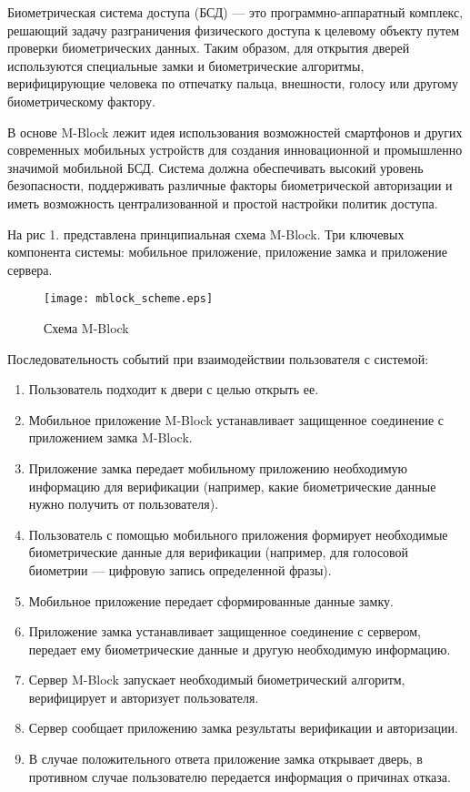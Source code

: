 \documentclass[twoside,a4paper]{msmb} %
\begin{document}
Биометрическая система доступа (БСД) --- это программно-аппаратный комплекс, решающий задачу разграничения физического доступа к целевому объекту путем проверки биометрических данных. Таким образом, для открытия дверей используются специальные замки и биометрические алгоритмы, верифицирующие человека по отпечатку пальца, внешности, голосу или другому биометрическому фактору.

В основе M-Block лежит идея использования возможностей смартфонов и других современных мобильных устройств для создания инновационной и промышленно значимой мобильной БСД. Система должна обеспечивать высокий уровень безопасности, поддерживать различные факторы биометрической авторизации и иметь возможность централизованной и простой настройки политик доступа.

На рис 1. представлена принципиальная схема M-Block. Три ключевых компонента системы: мобильное приложение, приложение замка и приложение сервера. 

\begin{figure}[ht] %
\centering
\texttt{[image: mblock\_scheme.eps]}\\
\caption{Схема M-Block}%
\label{pic}%
\end{figure}

Последовательность событий при взаимодействии пользователя с системой:
\begin{enumerate}
\item Пользователь подходит к двери с целью открыть ее.
\item Мобильное приложение M-Block устанавливает защищенное соединение с приложением замка M-Block.
\item Приложение замка передает мобильному приложению необходимую информацию для верификации (например, какие биометрические данные нужно получить от пользователя).
\item Пользователь с помощью мобильного приложения формирует необходимые биометрические данные для верификации (например, для голосовой биометрии --- цифровую запись определенной фразы).
\item Мобильное приложение передает сформированные данные замку.
\item Приложение замка устанавливает защищенное соединение с сервером, передает ему биометрические данные и другую необходимую информацию.
\item Сервер M-Block запускает необходимый биометрический алгоритм, верифицирует и авторизует пользователя.
\item Сервер сообщает приложению замка результаты верификации и авторизации.
\item В случае положительного ответа приложение замка открывает дверь, в противном случае пользователю передается информация о причинах отказа.
\end{enumerate}
\end{document}
